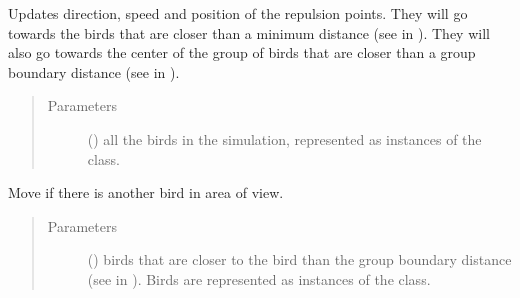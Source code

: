 \documentclass[a4paper,11pt,oneside,english]{sphinxmanual}
\begin{document}
\begin{fulllineitems}
\begin{fulllineitems}
\begin{quote}
\begin{description}
\end{description}\end{quote}

\bigskip 
\bigskip 

\end{fulllineitems}


\begin{fulllineitems}
\label{\detokenize{bird:bird.Bird.updateRepulsor}}
Updates direction, speed and position of the repulsion points. 
They will go towards the birds that are closer than a minimum distance (see  in {\hyperref[\detokenize{parameters:module-0}]{}}).
They will also go towards the center of the group of birds that are closer than a group boundary distance (see  in {\hyperref[\detokenize{parameters:module-0}]{}}).
\begin{quote}\begin{description}
\item[{Parameters}] \leavevmode
{} () \textendash{} all the birds in the simulation, represented as instances of the {\hyperref[\detokenize{bird:bird.Bird}]{}} class.

\end{description}\end{quote}

\bigskip 
\bigskip 

\end{fulllineitems}


\begin{fulllineitems}
\label{\detokenize{bird:bird.Bird.view}}
Move if there is another bird in area of view.
\begin{quote}\begin{description}
\item[{Parameters}] \leavevmode
{} () \textendash{} birds that are closer to the bird than the group boundary distance (see  in {\hyperref[\detokenize{parameters:module-0}]{}}). Birds are represented as instances of the {\hyperref[\detokenize{bird:bird.Bird}]{}} class.


\end{description}
\end{quote}
\end{fulllineitems}
\end{fulllineitems}
\end{document}
